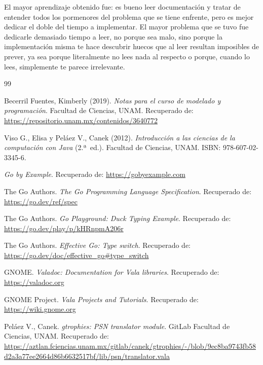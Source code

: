 \documentclass[11pt, a4paper]{article}
\begin{document}
El mayor aprendizaje obtenido fue: es bueno leer documentación y tratar de entender todos los pormenores del problema que se tiene enfrente, pero es mejor dedicar el doble del tiempo a implementar. El mayor problema que se tuvo fue dedicarle demasiado tiempo a leer, no porque sea malo, sino porque la implementación misma te hace descubrir huecos que al leer resultan imposibles de prever, ya sea porque literalmente no lees nada al respecto o porque, cuando lo lees, simplemente te parece irrelevante.

\begin{thebibliography}{99}

Becerril Fuentes, Kimberly (2019). \textit{Notas para el curso de modelado y programación}. Facultad de Ciencias, UNAM. Recuperado de: \url{https://repositorio.unam.mx/contenidos/3640772}

Viso G., Elisa y Peláez V., Canek (2012). \textit{Introducción a las ciencias de la computación con Java} (2.ª~ed.). Facultad de Ciencias, UNAM. ISBN: 978-607-02-3345-6.

\textit{Go by Example}. Recuperado de: \url{https://gobyexample.com}

The Go Authors. \textit{The Go Programming Language Specification}. Recuperado de: \url{https://go.dev/ref/spec}

The Go Authors. \textit{Go Playground: Duck Typing Example}. Recuperado de: \url{https://go.dev/play/p/kHRnpmA206r}

The Go Authors. \textit{Effective Go: Type switch}. Recuperado de: \url{https://go.dev/doc/effective_go#type_switch}

GNOME. \textit{Valadoc: Documentation for Vala libraries}. Recuperado de: \url{https://valadoc.org}

GNOME Project. \textit{Vala Projects and Tutorials}. Recuperado de: \url{https://wiki.gnome.org}

Peláez V., Canek. \textit{gtrophies: PSN translator module}. GitLab Facultad de Ciencias, UNAM. Recuperado de: \url{https://aztlan.fciencias.unam.mx/gitlab/canek/gtrophies/-/blob/9ec8ba9743fb58d2a3a77ee2664d86b6632517bf/lib/psn/translator.vala}

\end{thebibliography}
\end{document}
